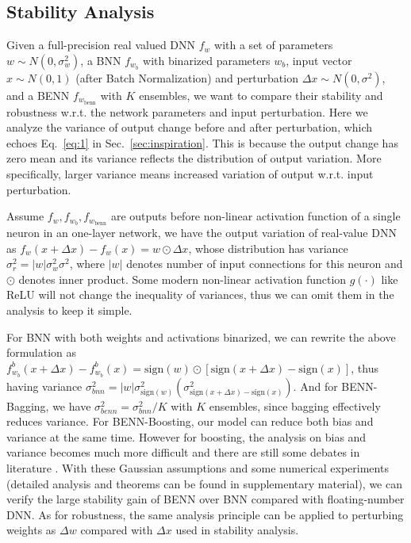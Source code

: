 \documentclass[10pt,twocolumn,letterpaper]{article}
\begin{document}
\subsection{Stability Analysis}
\label{sec:analysis}
Given a full-precision real valued DNN $f_{w}$ with a set of parameters $w \sim N(0,\sigma_{w}^{2})$, a BNN $f_{w_{b}}$ with binarized parameters $w_{b}$, input vector $x \sim N(0,1)$ (after Batch Normalization) and perturbation $\Delta x \sim N(0,\sigma^{2})$, and a BENN $f_{w_{\text{benn}}}$ with $K$ ensembles, we want to compare their stability and robustness w.r.t. the network parameters and input perturbation. Here we analyze the variance of output change before and after perturbation, which echoes Eq.~\ref{eq:1} in Sec.~\ref{sec:inspiration}. This is because the output change has zero mean and its variance reflects the distribution of output variation. More specifically, larger variance means increased variation of output w.r.t. input perturbation.

Assume $f_{w}, f_{w_{b}}, f_{w_{\text{benn}}}$ are outputs before non-linear activation function of a single neuron in an one-layer network, we have the output variation of real-value DNN as $f_{w}(x+\Delta x) - f_{w}(x) = w \odot \Delta x$, 
whose distribution has variance $\sigma_{r}^{2} = |w|\sigma_{w}^{2}\sigma^{2}$, where $|w|$ denotes number of input connections for this neuron and $\odot$ denotes inner product. Some modern non-linear activation function $g(\cdot)$ like ReLU will not change the inequality of variances, thus we can omit them in the analysis to keep it simple.

For BNN with both weights and activations binarized, we can rewrite the above formulation as $f_{w_{b}}^{b}(x+\Delta x) - f_{w_{b}}^{b}(x) = \text{sign}(w) \odot [\text{sign}(x+\Delta x) - \text{sign}(x)]$, thus having variance $\sigma_{bnn}^{2} = |w|\sigma_{\text{sign}(w)}^{2}(\sigma_{\text{sign}(x+\Delta x)-\text{sign}(x)}^{2})$. And for BENN-Bagging, we have $\sigma_{benn}^{2} = \sigma_{bnn}^{2} / K$ with $K$ ensembles, since bagging effectively reduces variance. For BENN-Boosting, our model can reduce both bias and variance at the same time. However for boosting, the analysis on bias and variance becomes much more difficult and there are still some debates in literature \cite{buhlmann2007boosting, friedman2000additive}. With these Gaussian assumptions and some numerical experiments (detailed analysis and theorems can be found in supplementary material), we can verify the large stability gain of BENN over BNN compared with floating-number DNN. As for robustness, the same analysis principle can be applied to perturbing weights as $\Delta w$ compared with $\Delta x$ used in stability analysis.
\end{document}
